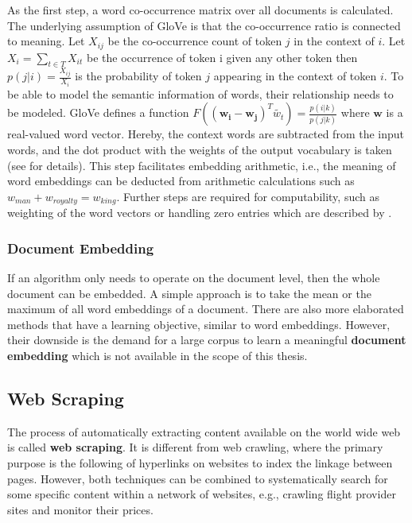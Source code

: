   As the first step, a word co-occurrence matrix over all documents is calculated.
  The underlying assumption of GloVe is that the co-occurrence ratio is connected to meaning.
  Let $X_{ij}$ be the co-occurrence count of token $j$ in the context of $i$. Let $X_i = \sum_{t \in T} X_{it}$ be the occurrence of token i given any other token then $p(j|i) = \frac{X_{ij}}{X_i}$ is the probability of token $j$ appearing in the context of token $i$.
  To be able to model the semantic information of words, their relationship needs to be modeled.
  GloVe defines a function $F((\mathbf{w_i} - \mathbf{w_j})^T \widetilde{w_t}) = \frac{p(i|k)}{p(j|k)}$ where $\mathbf{w}$ is a real-valued word vector.
  Hereby, the context words are subtracted from the input words, and the dot product with the weights of the output vocabulary is taken (see \cite{Pennington2014} for details).
  This step facilitates embedding arithmetic, i.e., the meaning of word embeddings can be deducted from arithmetic calculations such as $w_{man} + w_{royalty} = w_{king}$.
  Further steps are required for computability, such as weighting of the word vectors or handling zero entries which are described by \cite{Pennington2014}.

\subsubsection{Document Embedding}
  If an algorithm only needs to operate on the document level, then the whole document can be embedded.
  A simple approach is to take the mean or the maximum of all word embeddings of a document.
  There are also more elaborated methods \citep{Wu2018, Liu2018, Andrew2015} that have a learning objective, similar to word embeddings.
  However, their downside is the demand for a large corpus to learn a meaningful \textbf{document embedding} which is not available in the scope of this thesis.

\subsection{Web Scraping}
  The process of automatically extracting content available on the world wide web is called \textbf{web scraping}.
  It is different from web crawling, where the primary purpose is the following of hyperlinks on websites to index the linkage between pages.
  However, both techniques can be combined to systematically search for some specific content within a network of websites, e.g., crawling flight provider sites and monitor their prices.

